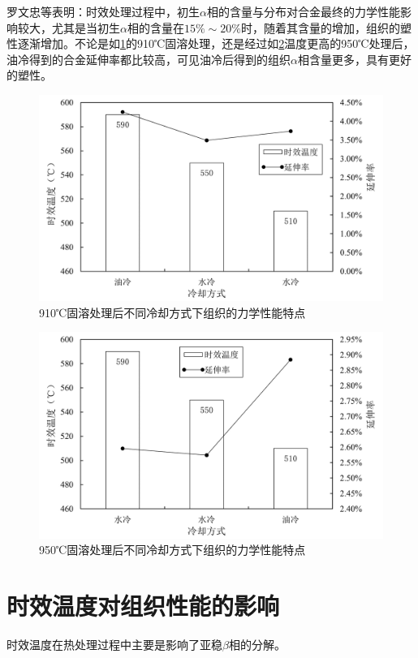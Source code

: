 罗文忠等表明：时效处理过程中，初生$\alpha$相的含量与分布对合金最终的力学性能影响较大，尤其是当初生$\alpha$相的含量在$15\% \sim 20\%$时，随着其含量的增加，组织的塑性逐渐增加。不论是如\ref{910}的910℃固溶处理，还是经过如\ref{950}温度更高的950℃处理后，油冷得到的合金延伸率都比较高，可见油冷后得到的组织$\alpha$相含量更多，具有更好的塑性。
\begin{figure}[h!]
	\centering
			\includegraphics[width=1\linewidth]{pic/910℃固溶处理后不同冷却方式下组织的力学性能特点}
	\caption{910℃固溶处理后不同冷却方式下组织的力学性能特点}
	\label{910}
\end{figure}
\begin{figure}[h!]
	\centering
	\includegraphics[width=1\linewidth]{pic/950℃固溶处理后不同冷却方式下组织的力学性能特点}
	\caption{950℃固溶处理后不同冷却方式下组织的力学性能特点}
	\label{950}
\end{figure}

\section{时效温度对组织性能的影响}
时效温度在热处理过程中主要是影响了亚稳$\beta $相的分解。

